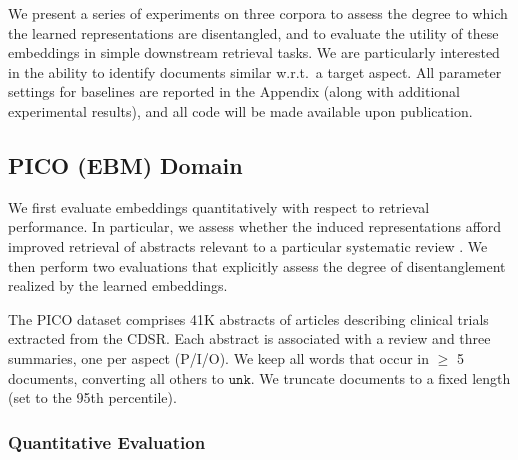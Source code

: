 \documentclass[11pt,a4paper]{article}
\begin{document}
We present a series of experiments on three corpora to assess the degree to which the learned representations are disentangled, and to evaluate the utility of these embeddings in simple downstream retrieval tasks. We are particularly interested in the ability to identify documents similar w.r.t.~a target aspect. All parameter settings for baselines are reported in the Appendix (along with additional experimental results), and all code will be made available upon publication.

\subsection{PICO (EBM) Domain}
\label{section:PICO}
\vspace{-.25em}

We first evaluate embeddings quantitatively with respect to retrieval performance. In particular, we assess whether the induced representations afford improved retrieval of abstracts relevant to a particular systematic review \cite{cohen2006reducing,wallace2010semi}. We then perform two evaluations that explicitly assess the degree of disentanglement realized by the learned embeddings.

The PICO dataset comprises 41K abstracts of articles describing clinical trials extracted from the CDSR. Each abstract is associated with a review and three summaries, one per aspect (P/I/O). We keep all words that occur in $\geq$ 5 documents, converting all others to $\texttt{unk}$. We truncate documents to a fixed length (set to the 95th percentile). 




\vspace{-.1em}
\subsubsection{Quantitative Evaluation}
\vspace{-.25em}
\end{document}
